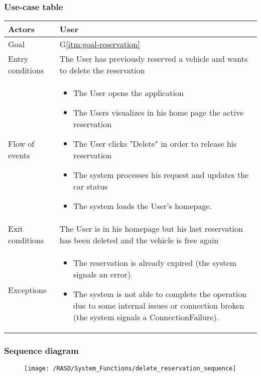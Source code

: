 \subsubsection{Use-case table}
\begin{center}
  \begin{tabular}{ l | p{10cm} }
    \hline
    Actors & User\\ \hline
    Goal & G\ref{itm:goal-reservation}\\ \hline
    Entry conditions & The User has previously reserved a vehicle and wants to delete the reservation
     \\ \hline
    Flow of events &
    \begin{itemize} 
      \item The User opens the application 
      \item The Users visualizes in his home page the active reservation
      \item The User clicks "Delete" in order to release his reservation
      \item The system processes his request and updates the car status
      \item The system loads the User's homepage.
    \end{itemize} \\ \hline
    Exit conditions & The User is in his homepage but his last reservation has been deleted and the vehicle is free again \\ \hline
  	Exceptions & 
    \begin{itemize}
      \item The reservation is already expired (the system signals an error).
      \item The system is not able to complete the operation due to some internal issues or connection broken (the system signals a ConnectionFailure).
    \end{itemize} \\ \hline
  \end{tabular}
\end{center}


\subsubsection{Sequence diagram}
\begin{figure}[!ht]
  \centering
  \vspace{0.1cm}
  \texttt{[image: /RASD/System\_Functions/delete\_reservation\_sequence]}\\
  \vspace{0.1cm}
  \label{fig:delete_reservation_sequence} 
\end{figure}
